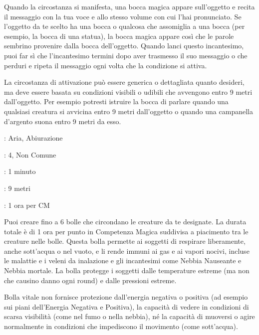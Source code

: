 \begin{multicols}{2}
Quando la circostanza si manifesta, una bocca magica appare sull'oggetto e recita il messaggio con la tua voce e allo stesso volume con cui l'hai pronunciato. Se l'oggetto da te scelto ha una bocca o qualcosa che assomiglia a una bocca (per esempio, la bocca di una statua), la bocca magica appare così che le parole sembrino provenire dalla bocca dell'oggetto. Quando lanci questo incantesimo, puoi far sì che l'incantesimo termini dopo aver trasmesso il suo messaggio o che perduri e ripeta il messaggio ogni volta che la condizione si attiva.

La circostanza di attivazione può essere generica o dettagliata quanto desideri, ma deve essere basata su condizioni visibili o udibili che avvengono entro 9 metri dall'oggetto. Per esempio potresti istruire la bocca di parlare quando una qualsiasi creatura si avvicina entro 9 metri dall'oggetto o quando una campanella d'argento suona entro 9 metri da esso.

\noindent\colorbox{OBSSgold!10}{
\begin{minipage}{0.95\linewidth}
\begin{description}[noitemsep, topsep=0pt, parsep=0pt, partopsep=0pt, leftmargin=0cm, labelwidth=1.3cm]
	\item[\textbf{Lista}]: Aria, Abiurazione
	\item[\textbf{Livello}]: 4, Non Comune
	\item[\textbf{Lancio}]: 1 minuto
	\item[\textbf{Gittata}]: 9 metri
	\item[\textbf{Durata}]: 1 ora per CM
\end{description}
\end{minipage}}\smallskip

Puoi creare fino a 6 bolle che circondano le creature da te designate.
La durata totale è di 1 ora per punto in Competenza Magica suddivisa a piacimento tra le creature nelle bolle.
Questa bolla permette ai soggetti di respirare liberamente, anche sott'acqua o nel vuoto, e li rende immuni ai gas e ai vapori nocivi, incluse le malattie e i veleni da inalazione e gli incantesimi come Nebbia Nauseante e Nebbia mortale. La bolla protegge i soggetti dalle temperature estreme (ma non che causino danno ogni round) e dalle pressioni estreme.

Bolla vitale non fornisce protezione dall'energia negativa o positiva (ad esempio sui piani dell'Energia Negativa e Positiva), la capacità di vedere in condizioni di scarsa visibilità (come nel fumo o nella nebbia), né la capacità di muoversi o agire normalmente in condizioni che impediscono il movimento (come sott'acqua).



\end{multicols}

